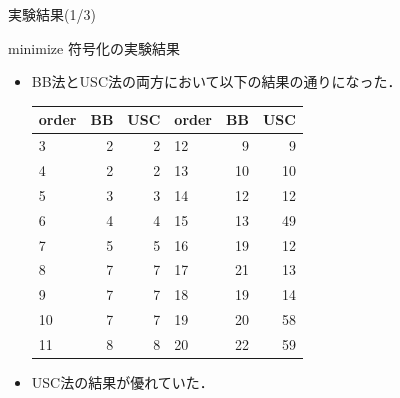 \documentclass[dvipdfmx,11pt]{beamer}
\begin{document}
\begin{frame}{実験結果(1/3)}
 \begin{block}{minimize}
  符号化の実験結果
  \begin{itemize}
   \item BB法とUSC法の両方において以下の結果の通りになった．
         \begin{table}
          \begin{tabular}{l|r|r||l|r|r}
           \hline
           order & BB & USC & order & BB & USC \\
           \hline
           3  & \alert{2}  & \alert{2}   & 12 & \alert{9}  & \alert{9}  \\
           4  & \alert{2}  & \alert{2}   & 13 & \alert{10} & \alert{10} \\
           5  & \alert{3}  & \alert{3}   & 14 & 12         & \alert{12} \\
           6  & \alert{4}  & \alert{4}   & 15 & 13         & 49         \\
           7  & \alert{5}  & \alert{5}   & 16 & 19         & \alert{12} \\
           8  & \alert{7}  & \alert{7}   & 17 & 21         & \alert{13} \\
           9  & \alert{7}  & \alert{7}   & 18 & 19         & \alert{14} \\
           10 & \alert{7}  & \alert{7}   & 19 & 20         & 58         \\
           11 & \alert{8}  & \alert{8}   & 20 & 22         & 59         \\
           \hline
          \end{tabular}
         \end{table}
   \item USC法の結果が優れていた．
  \end{itemize}
 \end{block}
\end{frame}

\end{document}
